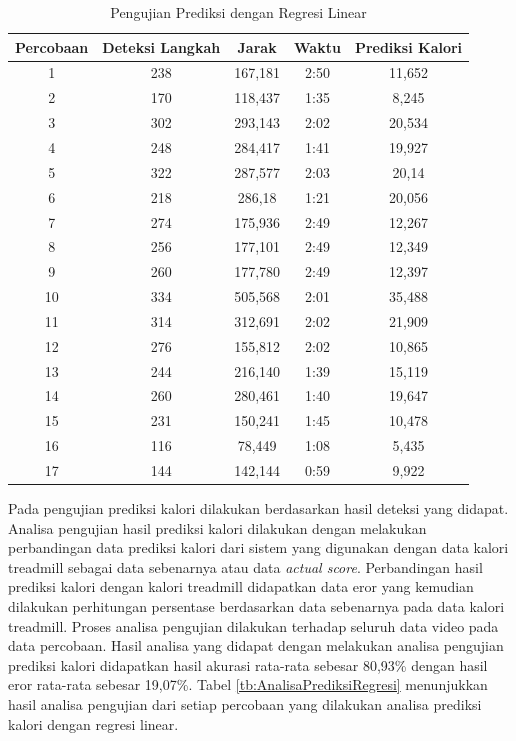 \begin{longtable}{|c|c|c|c|c|}
  \caption{Pengujian Prediksi dengan Regresi Linear}
  \label{tb:PengujianPrediksiRegresi}                                   \\
  \hline
  \rowcolor[HTML]{C0C0C0}
  \textbf{Percobaan} & \textbf{Deteksi Langkah} & \textbf{Jarak} & \textbf{Waktu} & \textbf{Prediksi Kalori} \\
  \hline
  1   & 238   & 167,181    & 2:50    & 11,652  \\
  \hline
  2   & 170   & 118,437    & 1:35    & 8,245   \\
  \hline
  3   & 302   & 293,143    & 2:02    & 20,534  \\
  \hline
  4   & 248   & 284,417    & 1:41    & 19,927  \\
  \hline
  5   & 322   & 287,577    & 2:03    & 20,14   \\
  \hline
  6   & 218   & 286,18     & 1:21    & 20,056  \\
  \hline
  7   & 274   & 175,936    & 2:49    & 12,267  \\
  \hline
  8   & 256   & 177,101    & 2:49    & 12,349  \\
  \hline
  9   & 260   & 177,780    & 2:49    & 12,397  \\
  \hline
  10   & 334   & 505,568   & 2:01    & 35,488  \\
  \hline
  11   & 314   & 312,691   & 2:02    & 21,909  \\
  \hline
  12   & 276   & 155,812   & 2:02    & 10,865  \\
  \hline
  13   & 244   & 216,140   & 1:39    & 15,119  \\
  \hline
  14   & 260   & 280,461   & 1:40    & 19,647  \\
  \hline
  15   & 231   & 150,241   & 1:45    & 10,478  \\
  \hline
  16   & 116   & 78,449    & 1:08    & 5,435  \\
  \hline
  17   & 144   & 142,144   & 0:59    & 9,922  \\
  \hline
\end{longtable}

Pada pengujian prediksi kalori dilakukan berdasarkan hasil deteksi yang didapat. Analisa pengujian hasil prediksi kalori dilakukan dengan melakukan perbandingan data prediksi kalori dari sistem yang digunakan dengan data kalori treadmill sebagai data sebenarnya atau data \emph{actual score}. Perbandingan hasil prediksi kalori dengan kalori treadmill didapatkan data eror yang kemudian dilakukan perhitungan persentase berdasarkan data sebenarnya pada data kalori treadmill. Proses analisa pengujian dilakukan terhadap seluruh data video pada data percobaan. Hasil analisa yang didapat dengan melakukan analisa pengujian prediksi kalori didapatkan hasil akurasi rata-rata sebesar 80,93\% dengan hasil eror rata-rata sebesar 19,07\%. Tabel \ref{tb:AnalisaPrediksiRegresi} menunjukkan hasil analisa pengujian dari setiap percobaan yang dilakukan analisa prediksi kalori dengan regresi linear.


